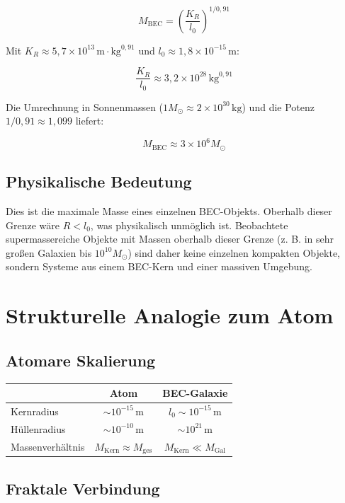 \[
M_{\text{BEC}} = \left( \frac{K_R}{l_0} \right)^{1/0,91} \tag{L.17}
\]

Mit \( K_R \approx 5,7 \times 10^{13} \, \text{m} \cdot \text{kg}^{0,91} \) 
und \( l_0 \approx 1,8 \times 10^{-15} \, \text{m} \):

\[
\frac{K_R}{l_0} \approx 3,2 \times 10^{28} \, \text{kg}^{0,91}
\]

Die Umrechnung in Sonnenmassen (\( 1 M_{\odot} \approx 2 \times 10^{30} \, \text{kg} \)) 
und die Potenz \( 1/0,91 \approx 1,099 \) liefert:

\[
M_{\text{BEC}} \approx 3 \times 10^6 M_{\odot} \tag{L.18}
\]

\subsection{Physikalische Bedeutung}

Dies ist die maximale Masse eines einzelnen BEC-Objekts. 
Oberhalb dieser Grenze wäre \( R < l_0 \), was physikalisch unmöglich ist. 
Beobachtete supermassereiche Objekte mit Massen oberhalb dieser Grenze 
(z. B. in sehr großen Galaxien bis \( 10^{10} M_{\odot} \)) sind daher 
keine einzelnen kompakten Objekte, sondern Systeme aus einem 
BEC-Kern und einer massiven Umgebung.

\section{Strukturelle Analogie zum Atom}

\subsection{Atomare Skalierung}

\begin{center}
\begin{tabular}{lcc}
\hline
 & Atom & BEC-Galaxie \\
\hline
Kernradius & \( \sim 10^{-15} \, \text{m} \) & \( l_0 \sim 10^{-15} \, \text{m} \) \\
Hüllenradius & \( \sim 10^{-10} \, \text{m} \) & \( \sim 10^{21} \, \text{m} \) \\
Massenverhältnis & \( M_{\text{Kern}} \approx M_{\text{ges}} \) & \( M_{\text{Kern}} \ll M_{\text{Gal}} \) \\
\hline
\end{tabular}
\end{center}

\subsection{Fraktale Verbindung}

